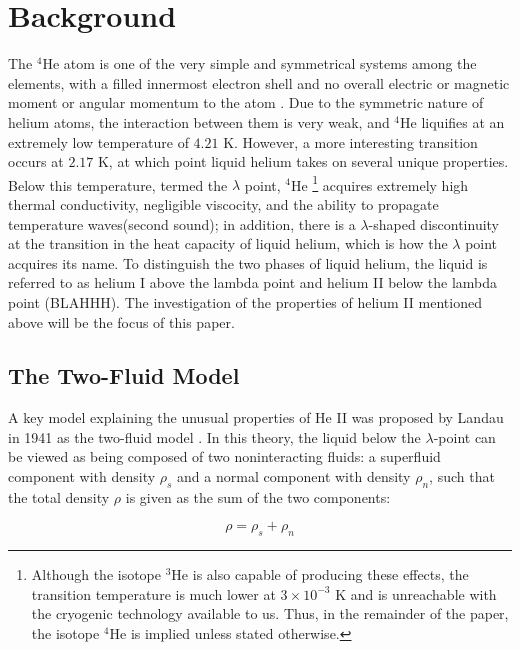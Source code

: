 
\section{Background}\label{background}

The $^4$He atom is one of the very simple and symmetrical systems
among the elements, with a filled innermost electron shell and no
overall electric or magnetic moment or angular momentum to the atom
\cite{atkins}. Due to the symmetric nature of helium atoms, the
interaction between them is very weak, and $^4$He liquifies at an
extremely low temperature of $4.21$ K. However, a more interesting
transition occurs at $2.17$ K, at which point liquid helium takes on
several unique properties. Below this temperature, termed the
$\lambda$ point, $^4$He \footnote{Although the isotope $^3$He is also
  capable of producing these effects, the transition temperature is
  much lower at $3\times 10^{-3}$ K and is unreachable with the
  cryogenic technology available to us. Thus, in the remainder of the
  paper, the isotope $^4$He is implied unless stated otherwise.}
acquires extremely high thermal conductivity, negligible viscocity,
and the ability to propagate temperature waves(second sound); in
addition, there is a $\lambda$-shaped discontinuity at the transition
in the heat capacity of liquid helium, which is how the $\lambda$
point acquires its name. To distinguish the two phases of liquid
helium, the liquid is referred to as helium I above the lambda point
and helium II below the lambda point (BLAHHH). The investigation of
the properties of helium II mentioned above will be the focus of this
paper.

\subsection{The Two-Fluid Model}

A key model explaining the unusual properties of He II was proposed by
Landau in 1941 as the two-fluid model \cite{landau}. In this theory,
the liquid below the $\lambda$-point can be viewed as being composed
of two noninteracting fluids: a superfluid component with density
$\rho_s$ and a normal component with density $\rho_n$, such that the
total density $\rho$ is given as the sum of the two components:

\begin{equation}
\rho = \rho_s + \rho_n
\end{equation}

